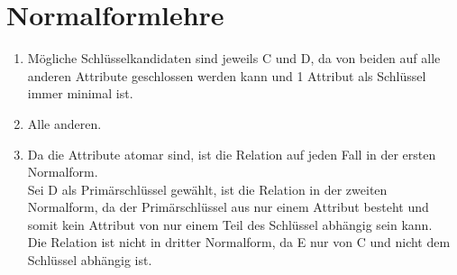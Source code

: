 \documentclass[ngerman]{gdb-aufgabenblatt}
\begin{document}
\section{ }
\section{ }
\section{Normalformlehre}
\begin{enumerate}
\item 
M{\"o}gliche Schl{\"u}sselkandidaten sind jeweils C und D, da von beiden auf alle anderen Attribute geschlossen werden kann und 1 Attribut als Schl{\"u}ssel immer minimal ist.
\item
Alle anderen.
\item
Da die Attribute atomar sind, ist die Relation auf jeden Fall in der ersten Normalform.\\
Sei D als Prim{\"a}rschl{\"u}ssel gew{\"a}hlt, ist die Relation in der zweiten Normalform, da der Prim{\"a}rschl{\"u}ssel aus nur einem Attribut besteht und somit kein Attribut von nur einem Teil des Schl{\"u}ssel abh{\"a}ngig sein kann.\\
Die Relation ist nicht in dritter Normalform, da E nur von C und nicht dem Schl{\"u}ssel abh{\"a}ngig ist.
\end{enumerate}
\end{document}
